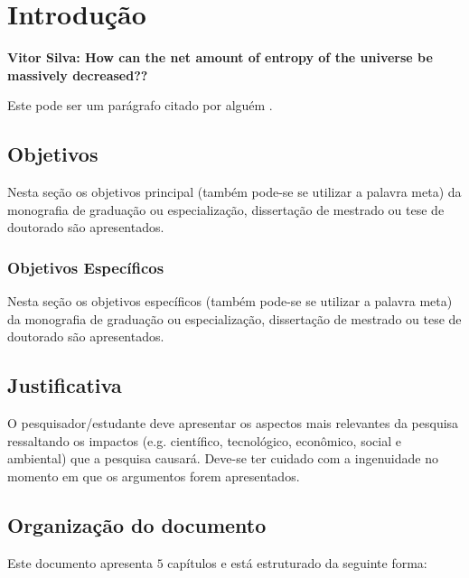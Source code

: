 \chapter{Introdução}
\label{chap:intro}

\textbf{Vitor Silva:  How can the net amount of entropy of the universe be massively decreased??}

Este pode ser um parágrafo citado por alguém \cite{Barabasi2003-1}.

\section{Objetivos}
\label{sec:obj}

Nesta se\c{c}\~ao os objetivos principal (tamb\'em
pode-se se utilizar a palavra meta) da monografia de
gradua\c{c}\~ao ou especializa\c{c}\~ao, disserta\c{c}\~ao de
mestrado ou tese de doutorado s\~ao apresentados.


\subsection{Objetivos Específicos}
\label{ssec:objesp}

Nesta se\c{c}\~ao os objetivos espec\'ificos (tamb\'em
pode-se se utilizar a palavra meta) da monografia de
gradua\c{c}\~ao ou especializa\c{c}\~ao, disserta\c{c}\~ao de
mestrado ou tese de doutorado s\~ao apresentados.


\section{Justificativa}
\label{sec:justi}

O pesquisador/estudante deve apresentar os aspectos mais
relevantes da pesquisa ressaltando os impactos (e.g. cient\'ifico,
tecnol\'ogico, econ\^omico, social e ambiental) que a pesquisa
causar\'a. Deve-se ter cuidado com a ingenuidade no momento em que
os argumentos forem apresentados.




\section{Organização do documento}
\label{section:organizacao}

Este documento apresenta $5$ capítulos e está estruturado da seguinte forma:

